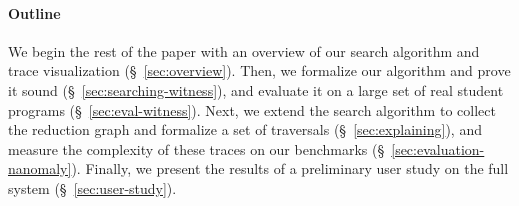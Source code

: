 \paragraph{Outline}
We begin the rest of the paper with an overview of our search algorithm
and trace visualization (\S~\ref{sec:overview}).
%
Then, we formalize our algorithm and prove it sound
(\S~\ref{sec:searching-witness}), and evaluate it on a large set of real
student programs (\S~\ref{sec:eval-witness}).
%
Next, we extend the search algorithm to collect the reduction graph and
formalize a set of traversals (\S~\ref{sec:explaining}), and measure the
complexity of these traces on our benchmarks
(\S~\ref{sec:evaluation-nanomaly}).
%
Finally, we present the results of a preliminary user study on the full
system (\S~\ref{sec:user-study}).

